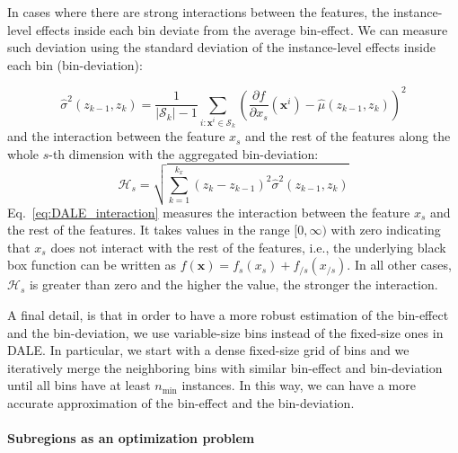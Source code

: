 \documentclass[12pt]{article}
\newcommand{\dfdx}{\frac{\partial f}{\partial x_s}}
\newcommand{\xb}{\mathbf{x}}
\begin{document}
In cases where there are strong interactions between the features,
the instance-level effects inside each bin deviate from the average bin-effect.
We can measure such deviation using the standard deviation of the instance-level effects inside each bin (bin-deviation):

\begin{equation}
  \label{eq:var_bin_approx}
  \hat{\sigma}^2(z_{k-1}, z_k) = \frac{1}{|\mathcal{S}_k| - 1}
\sum_{i:\mathbf{x}^i \in \mathcal{S}_k} \left ( \dfdx(\mathbf{x}^i) -
  \hat{\mu}(z_{k-1}, z_k) \right )^2
\end{equation}
%
and the interaction between the feature \(x_s\) and the rest of the features along the whole \(s\)-th dimension
with the aggregated bin-deviation:
\begin{equation}
  \label{eq:DALE_interaction}
  \mathcal{H}_s = \sqrt{ \sum_{k=1}^{k_x} (z_k - z_{k-1})^2 \hat{\sigma}^2(z_{k-1}, z_k) }
\end{equation}
%
Eq.~\eqref{eq:DALE_interaction} measures the interaction between the feature \(x_s\) and the rest of the features.
It takes values in the range \([0, \infty)\) with zero indicating that \(x_s\) does not interact with the rest of the features,
i.e., the underlying black box function can be written as $f(\xb) = f_s(x_s) + f_{/s}(x_{/s})$.
In all other cases, $\mathcal{H}_s$ is greater than zero and the higher the value, the stronger the interaction.

A final detail, is that in order to have a more robust estimation of the bin-effect and the bin-deviation,
we use variable-size bins instead of the fixed-size ones in DALE.
In particular, we start with a dense fixed-size grid of bins and we iteratively merge the neighboring bins with similar
bin-effect and bin-deviation until all bins have at least $n_{\min}$ instances.
In this way, we can have a more accurate approximation of the bin-effect and the bin-deviation.

\paragraph{Subregions as an optimization problem}
\end{document}
